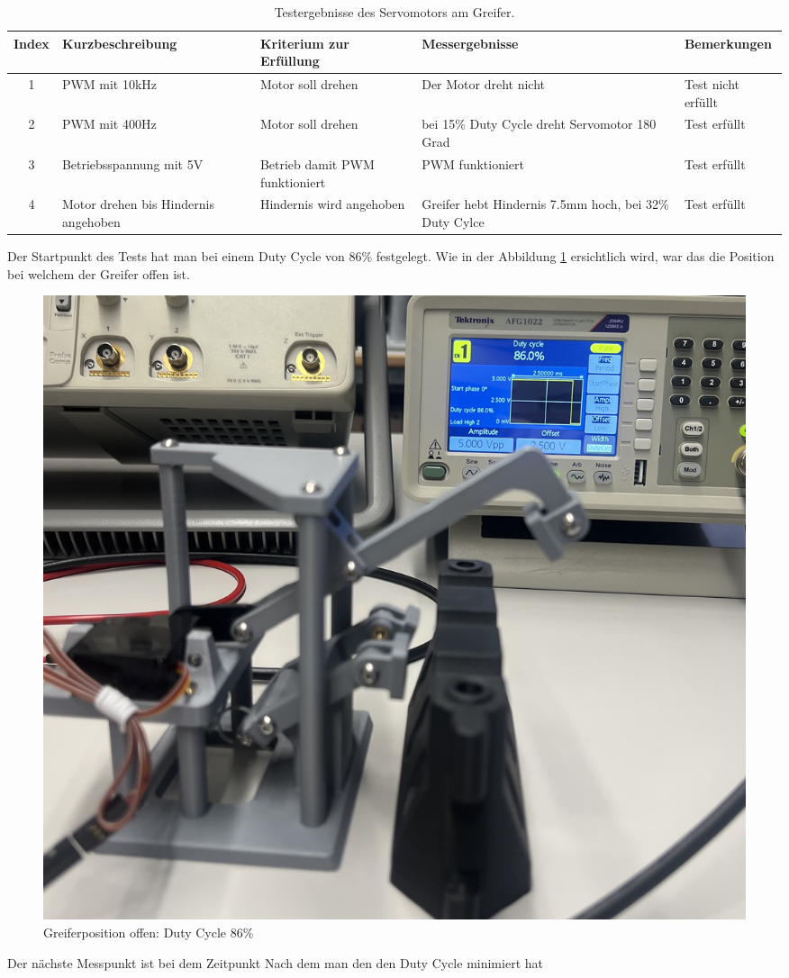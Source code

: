 \begin{table}[H]
\centering
\small
\begin{tabularx}{\textwidth}{|c|X|X|X|l|}
        \hline
        \textbf{Index} & \textbf{Kurzbeschreibung} & \textbf{Kriterium zur Erfüllung} & \textbf{Messergebnisse} & \textbf{Bemerkungen} \\
        \hline \hline
        1 & PWM mit 10kHz & Motor soll drehen & Der Motor dreht nicht & Test nicht erfüllt \\ \hline
        2 & PWM mit 400Hz & Motor soll drehen & bei 15\% Duty Cycle dreht Servomotor 180 Grad & Test erfüllt \\ \hline
        3 & Betriebsspannung mit 5V & Betrieb damit PWM funktioniert  & PWM funktioniert & Test erfüllt\\ \hline
        4 & Motor drehen bis Hindernis angehoben & Hindernis wird angehoben & Greifer hebt Hindernis 7.5mm hoch, bei 32\% Duty Cylce & Test erfüllt \\ \hline
\end{tabularx}
    \caption{Testergebnisse des Servomotors am Greifer.}
\label{tab:testpunkte Servomotor}
\end{table}


Der Startpunkt des Tests hat man bei einem Duty Cycle von 86\% festgelegt. Wie in der Abbildung \ref{fig: Greiferposition offen: Duty Cycle 86} ersichtlich wird, war das die Position bei welchem der Greifer offen ist.

\begin{figure}[H]
    \centering
    \includegraphics[width=0.8\linewidth]{img/ServoGreifferoffen.jpeg}
    \caption{Greiferposition offen: Duty Cycle 86\%}
    \label{fig: Greiferposition offen: Duty Cycle 86}
\end{figure}


Der nächste Messpunkt ist bei dem Zeitpunkt Nach dem man den den Duty Cycle minimiert hat 
